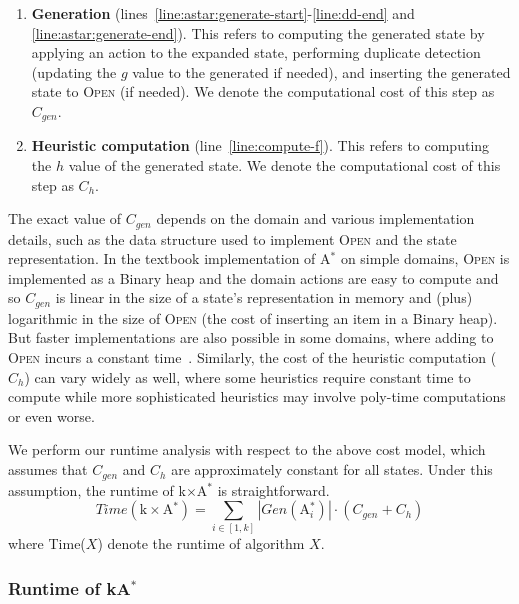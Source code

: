 \documentclass{aicom2e}
\newcommand{\astar}{A$^*$}
\newcommand{\kastar}{kA$^*$}
\newcommand{\kxastar}{k$\times$A$^*$}
\newcommand{\astari}[1]{A$^*_#1$}
\newcommand{\open}{\textsc{Open}}
\begin{document}
\begin{enumerate}
	\item {\bf Generation}  (lines~\ref{line:astar:generate-start}-\ref{line:dd-end} and \ref{line:astar:generate-end}).
	This refers to computing the generated state by applying an action to the expanded state,
	performing duplicate detection (updating the $g$ value to the generated if needed),
	and inserting the generated state to \open{} (if needed).
	We denote the computational cost of this step as $C_{gen}$.
	
	
	\item {\bf Heuristic computation}  (line~\ref{line:compute-f}). This refers to computing the $h$ value of the generated state.
	We denote the computational cost of this step as $C_{h}$.
\end{enumerate}

The exact value of $C_{gen}$ depends on the domain and various implementation
details, such as the data structure used to implement \open{} and the state
representation. In the textbook implementation of \astar{} on simple domains,
\open{} is implemented as a Binary heap and the domain actions are easy to
compute and so $C_{gen}$ is linear in the size  of a state's representation in
memory and (plus) logarithmic in the size of \open{} (the cost of inserting an
item in a Binary heap). But faster implementations are also possible in some
domains, where adding to \open{} incurs a constant
time~\cite{GILON2016,BurnsHLR12}. Similarly, the cost of the heuristic
computation ($C_h$) can vary widely as well, where some heuristics require
constant time to compute while more sophisticated heuristics may involve
poly-time computations or even worse.



We perform our runtime analysis with respect to the above cost model, 
which assumes that $C_{gen}$ and $C_h$ are approximately constant 
for all states. Under this assumption, the runtime of \kxastar{} is straightforward.
\[
Time(\text{\kxastar{}}) = \sum_{i\in[1,k]} |Gen(\text{\astari{i}})|\cdot (C_{gen}+C_h)
\]
where Time($X$) denote the runtime of algorithm $X$. 

\subsubsection{Runtime of \kastar{}}
\end{document}
